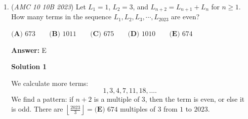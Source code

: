 \begin{enumerate}
 \[\Rightarrow 9n = 135 - 45\]

 \[\Rightarrow 9n = 90\]

 \[\Rightarrow n =\boxed{\textbf{(A) }10}\]




\textbf{Solution 4 (Solution 1 but more in depth)}

Notice how the problem tries to throw us off. We don't need to find the sum, but rather how many 3's do we need to remove to get to the sum.

 We have that \( 3a + 3b + 3c + 3d + \dots = 45 \). Dividing by 3 gives us \( a + b + c + d + \dots = 15 \).

 Notice how we can write Maddy's list like \( (a + b + c + d + \dots) + (3 + 3 + 3 + 3 + \dots) = 45 \). We know that \( a + b + c + d + \dots = 15 \), and we know that the definition of adding 3's repeatedly is just multiplying 3 by how many numbers it appears, \( l \), which is our list.

 This gives us the equation \( 15 + 3l = 45 \), and solving for \( l \) gives us $\boxed{A. 10}$

 This problem teaches us to look for patterns and use our elementary taught topics to our advantage.

 



\textbf{Solution 5}

Because the addition and multiplication of x were the same, we can see that \(2x = 3\). Therefore \(x = 1.5\) and \(45(1.5+3)\) = $\boxed{A. 10}$

 Credit to Pinotation for $LaTeX$



	\item (\textit{AMC 10 10B 2023}) Let  $L_1 = 1$, $L_2 = 3$, and $L_{n+2} = L_{n+1}+L_n$ for $n \geq 1$. How many terms in the sequence $L_1, L_2, L_3, \cdots, L_{2023}$ are even?


 $\textbf{(A) }673\qquad\textbf{(B) }1011\qquad\textbf{(C) }675\qquad\textbf{(D) }1010\qquad\textbf{(E) }674$

 \textbf{Answer: }E



\textbf{Solution 1}

We calculate more terms: 
 \[1,3,4,7,11,18,\ldots.\] We find a pattern: if $n+2$ is a multiple of $3$, then the term is even, or else it is odd. There are $\left\lfloor \frac{2023}{3} \right\rfloor =\boxed{\textbf{(E) }674}$ multiples of $3$ from $1$ to $2023$. 


\end{enumerate}
